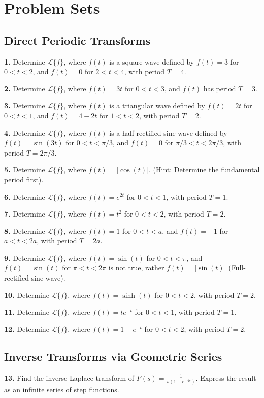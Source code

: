 \documentclass[11pt, letterpaper]{article}
\theoremstyle{definition}
\theoremstyle{remark}
\begin{document}
\newpage
\section{Problem Sets}

\subsection{Direct Periodic Transforms}
\textbf{1.} Determine $\mathcal{L}\{f\}$, where $f(t)$ is a square wave defined by $f(t) = 3$ for $0 < t < 2$, and $f(t) = 0$ for $2 < t < 4$, with period $T = 4$.

\textbf{2.} Determine $\mathcal{L}\{f\}$, where $f(t) = 3t$ for $0 < t < 3$, and $f(t)$ has period $T = 3$.

\textbf{3.} Determine $\mathcal{L}\{f\}$, where $f(t)$ is a triangular wave defined by $f(t) = 2t$ for $0 < t < 1$, and $f(t) = 4 - 2t$ for $1 < t < 2$, with period $T = 2$.

\textbf{4.} Determine $\mathcal{L}\{f\}$, where $f(t)$ is a half-rectified sine wave defined by $f(t) = \sin(3t)$ for $0 < t < \pi/3$, and $f(t) = 0$ for $\pi/3 < t < 2\pi/3$, with period $T = 2\pi/3$.

\textbf{5.} Determine $\mathcal{L}\{f\}$, where $f(t) = |\cos(t)|$. (Hint: Determine the fundamental period first).

\textbf{6.} Determine $\mathcal{L}\{f\}$, where $f(t) = e^{2t}$ for $0 < t < 1$, with period $T = 1$.

\textbf{7.} Determine $\mathcal{L}\{f\}$, where $f(t) = t^2$ for $0 < t < 2$, with period $T = 2$.

\textbf{8.} Determine $\mathcal{L}\{f\}$, where $f(t) = 1$ for $0 < t < a$, and $f(t) = -1$ for $a < t < 2a$, with period $T = 2a$.

\textbf{9.} Determine $\mathcal{L}\{f\}$, where $f(t) = \sin(t)$ for $0 < t < \pi$, and $f(t) = \sin(t)$ for $\pi < t < 2\pi$ is not true, rather $f(t) = |\sin(t)|$ (Full-rectified sine wave).

\textbf{10.} Determine $\mathcal{L}\{f\}$, where $f(t) = \sinh(t)$ for $0 < t < 2$, with period $T = 2$.

\textbf{11.} Determine $\mathcal{L}\{f\}$, where $f(t) = t e^{-t}$ for $0 < t < 1$, with period $T = 1$.

\textbf{12.} Determine $\mathcal{L}\{f\}$, where $f(t) = 1 - e^{-t}$ for $0 < t < 2$, with period $T = 2$.

\subsection{Inverse Transforms via Geometric Series}
\textbf{13.} Find the inverse Laplace transform of $F(s) = \frac{1}{s(1 - e^{-4s})}$. Express the result as an infinite series of step functions.
\end{document}
